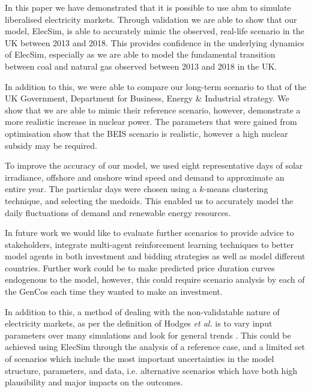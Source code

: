 



In this paper we have demonstrated that it is possible to use \acrshort{abm} to simulate liberalised electricity markets. Through validation we are able to show that our model, ElecSim, is able to accurately mimic the observed, real-life scenario in the UK between 2013 and 2018. This provides confidence in the underlying dynamics of ElecSim, especially as we are able to model the fundamental transition between coal and natural gas observed between 2013 and 2018 in the UK.

In addition to this, we were able to compare our long-term scenario to that of the UK Government, Department for Business, Energy \& Industrial strategy. We show that we are able to mimic their reference scenario, however, demonstrate a more realistic increase in nuclear power. The parameters that were gained from optimisation show that the BEIS scenario is realistic, however a high nuclear subsidy may be required.

To improve the accuracy of our model, we used eight representative days of solar irradiance, offshore and onshore wind speed and demand to approximate an entire year. The particular days were chosen using a $k$-means clustering technique, and selecting the medoids. This enabled us to accurately model the daily fluctuations of demand and renewable energy resources. 


In future work we would like to evaluate further scenarios to provide advice to stakeholders, integrate multi-agent reinforcement learning techniques to better model agents in both investment and bidding strategies as well as model different countries. Further work could be to make predicted price duration curves endogenous to the model, however, this could require scenario analysis by each of the GenCos each time they wanted to make an investment.

In addition to this, a method of dealing with the non-validatable nature of electricity markets, as per the definition of Hodges \textit{et al.} is to vary input parameters over many simulations and look for general trends \cite{Hodges}. This could be achieved using ElecSim through the analysis of a reference case, and a limited set of scenarios which include the most important uncertainties in the model structure, parameters, and data, i.e. alternative scenarios which have both high plausibility and major impacts on the outcomes.



















